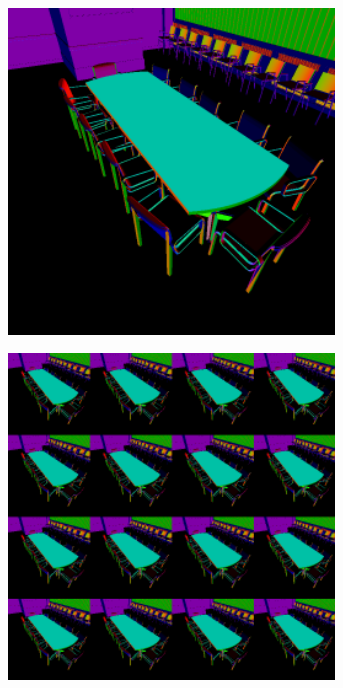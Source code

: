\begin{figure}[htb]
  \centering
  \begin{subfigure}[b]{0.33\textwidth}
    \centering\includegraphics[width=0.95\textwidth]{graphics/interleaved_segovia_1}
    \caption{\label{fig:concept:interleaved_segovia_1}}
  \end{subfigure}%
  \begin{subfigure}[b]{0.33\textwidth}
    \centering\includegraphics[width=0.95\textwidth]{graphics/interleaved_segovia_2}

\end{subfigure}
\end{figure}
